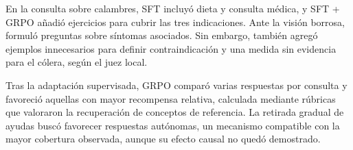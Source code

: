 En la consulta sobre calambres, SFT incluyó dieta y consulta médica, y SFT + GRPO añadió ejercicios para cubrir las tres indicaciones. Ante la visión borrosa, formuló preguntas sobre síntomas asociados. Sin embargo, también agregó ejemplos innecesarios para definir contraindicación y una medida sin evidencia para el cólera, según el juez local.

Tras la adaptación supervisada, GRPO comparó varias respuestas por consulta y favoreció aquellas con mayor recompensa relativa, calculada mediante rúbricas que valoraron la recuperación de conceptos de referencia. La retirada gradual de ayudas buscó favorecer respuestas autónomas, un mecanismo compatible con la mayor cobertura observada, aunque su efecto causal no quedó demostrado.
